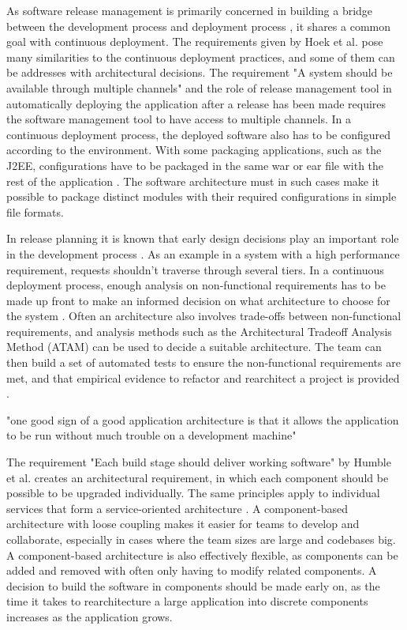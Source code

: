 \documentclass[conference]{IEEEtran}
\begin{document}
As software release management is primarily concerned in building a bridge between the development process and deployment process \cite{van1997software}, it shares a common goal with continuous deployment. The requirements given by Hoek et al. pose many similarities to the continuous deployment practices, and some of them can be addresses with architectural decisions. The requirement "A system should be available through multiple channels" and the role of release management tool in automatically deploying the application after a release has been made requires the software management tool to have access to multiple channels. In a continuous deployment process, the deployed software also has to be configured according to the environment. With some packaging applications, such as the J2EE, configurations have to be packaged in the same war or ear file with the rest of the application \cite{cdbook}. The software architecture must in such cases make it possible to package distinct modules with their required configurations in simple file formats.
 
In release planning it is known that early design decisions play an important role in the development process \cite{lindgren2008importance}. As an example in a system with a high performance requirement, requests shouldn't traverse through several tiers. In a continuous deployment process, enough analysis on non-functional requirements has to be made up front to make an informed decision on what architecture to choose for the system \cite{cdbook}. Often an architecture also involves trade-offs between non-functional requirements, and analysis methods such as the Architectural Tradeoff Analysis Method (ATAM) \cite{kazman1998architecture} can be used to decide a suitable architecture. The team can then build a set of automated tests to ensure the non-functional requirements are met, and that empirical evidence to refactor and rearchitect a project is provided \cite{cdbook}.

"one good sign of a good application architecture is that it allows the application to be run without much trouble on a development machine" \cite{cdbook}

The requirement "Each build stage should deliver working software" by Humble et al. \cite{humble2006deployment} creates an architectural requirement, in which each component should be possible to be upgraded individually. The same principles apply to individual services that form a service-oriented architecture \cite{cdbook}. A component-based architecture with loose coupling makes it easier for teams to develop and collaborate, especially in cases where the team sizes are large and codebases big. A component-based architecture is also effectively flexible, as components can be added and removed with often only having to modify related components. A decision to build the software in components should be made early on, as the time it takes to rearchitecture a large application into discrete components increases as the application grows. 
\end{document}
